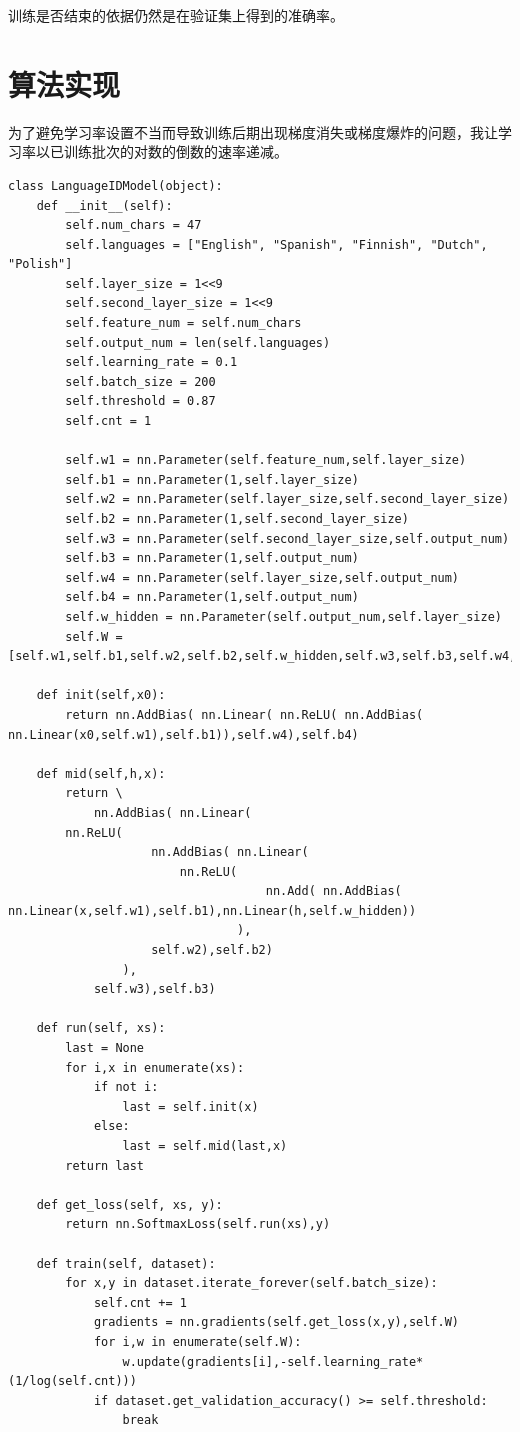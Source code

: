 训练是否结束的依据仍然是在验证集上得到的准确率。
\section{算法实现}
%
%
%
为了避免学习率设置不当而导致训练后期出现梯度消失或梯度爆炸的问题，我让学习率以已训练批次的对数的倒数的速率递减。
\begin{lstlisting}[emph={[3]dataset,x,y,xs},emphstyle={[3]\color{vscode_parametercolor}},emph={[4]LanguageIDModel,DigitClassificationModel,RegressionModel,GameState,MinimaxAgent,AlphaBetaAgent},emphstyle={[4]\color{vscode_classcolor}}]
class LanguageIDModel(object):
    def __init__(self):
        self.num_chars = 47
        self.languages = ["English", "Spanish", "Finnish", "Dutch", "Polish"]
        self.layer_size = 1<<9
        self.second_layer_size = 1<<9
        self.feature_num = self.num_chars
        self.output_num = len(self.languages)
        self.learning_rate = 0.1
        self.batch_size = 200
        self.threshold = 0.87
        self.cnt = 1

        self.w1 = nn.Parameter(self.feature_num,self.layer_size)
        self.b1 = nn.Parameter(1,self.layer_size)
        self.w2 = nn.Parameter(self.layer_size,self.second_layer_size)
        self.b2 = nn.Parameter(1,self.second_layer_size)
        self.w3 = nn.Parameter(self.second_layer_size,self.output_num)
        self.b3 = nn.Parameter(1,self.output_num)
        self.w4 = nn.Parameter(self.layer_size,self.output_num)
        self.b4 = nn.Parameter(1,self.output_num)
        self.w_hidden = nn.Parameter(self.output_num,self.layer_size)
        self.W = [self.w1,self.b1,self.w2,self.b2,self.w_hidden,self.w3,self.b3,self.w4,self.b4]

    def init(self,x0):
        return nn.AddBias( nn.Linear( nn.ReLU( nn.AddBias( nn.Linear(x0,self.w1),self.b1)),self.w4),self.b4)

    def mid(self,h,x):
        return \
            nn.AddBias( nn.Linear(
        nn.ReLU(
                    nn.AddBias( nn.Linear(
                        nn.ReLU(
                                    nn.Add( nn.AddBias( nn.Linear(x,self.w1),self.b1),nn.Linear(h,self.w_hidden))
                                ),
                    self.w2),self.b2)
                ),
            self.w3),self.b3)

    def run(self, xs):
        last = None
        for i,x in enumerate(xs):
            if not i:
                last = self.init(x)
            else:
                last = self.mid(last,x)
        return last

    def get_loss(self, xs, y):
        return nn.SoftmaxLoss(self.run(xs),y)

    def train(self, dataset):
        for x,y in dataset.iterate_forever(self.batch_size):
            self.cnt += 1
            gradients = nn.gradients(self.get_loss(x,y),self.W)
            for i,w in enumerate(self.W):
                w.update(gradients[i],-self.learning_rate*(1/log(self.cnt)))
            if dataset.get_validation_accuracy() >= self.threshold:
                break
\end{lstlisting}
